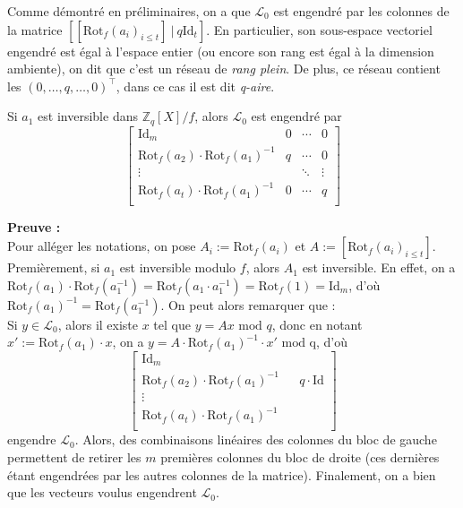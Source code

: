 \documentclass[11pt,a4paper]{article}
\begin{document}
Comme démontré en préliminaires, on a que $\mathcal{L}_0$ est engendré par les colonnes de la matrice $[[\text{Rot}_f(a_i)_{i\leq t}] \ |\ q\text{Id}_t]$. En particulier, son sous-espace vectoriel engendré est égal à l'espace entier (ou encore son rang est égal à la dimension ambiente), on dit que c'est un réseau de \textit{rang plein}. De plus, ce réseau contient les $(0,\dots,q,\dots,0)^\top$, dans ce cas il est dit \textit{q-aire}.\\

\begin{lemma}
Si $a_1$ est inversible dans $\mathbb{Z}_q[X]/f$, alors $\mathcal{L}_0$ est engendré par 
$$ \left[\begin{array}{c|ccc}
\text{Id}_m & 0 &\cdots &0\\
\text{Rot}_f(a_2)\cdot\text{Rot}_f(a_1)^{-1}&q&\cdots & 0\\
\vdots & &\ddots & \vdots\\
\text{Rot}_f(a_t)\cdot\text{Rot}_f(a_1)^{-1}& 0 & \cdots &q\\
\end{array}\right] $$
\end{lemma}
\textbf{Preuve :} \\
Pour alléger les notations, on pose $A_i := \text{Rot}_f(a_i)$ et $A:=[\text{Rot}_f(a_i)_{i\leq t}]$. Premièrement, si $a_1$ est inversible modulo $f$, alors $A_1$ est inversible. En effet, on a $\text{Rot}_f(a_1)\cdot\text{Rot}_f(a_1^{-1})=\text{Rot}_f(a_1\cdot a_1^{-1})=\text{Rot}_f(1)=\text{Id}_m$, d'où $\text{Rot}_f(a_1)^{-1}=\text{Rot}_f(a_1^{-1})$. On peut alors remarquer que : \\

Si $y \in \mathcal{L}_0$, alors il existe $x$ tel que $y=Ax \text{ mod } q$, donc en notant $x':=\text{Rot}_f(a_1)\cdot x$, on a $y=A\cdot\text{Rot}_f(a_1)^{-1}\cdot x' \text{ mod q}$, d'où 
$$ \left[\begin{array}{c|cccc}
\text{Id}_m \\
\text{Rot}_f(a_2)\cdot\text{Rot}_f(a_1)^{-1} & & q\cdot \text{Id}\\
\vdots &\\
\text{Rot}_f(a_t)\cdot\text{Rot}_f(a_1)^{-1}&\\
\end{array}\right] $$
engendre $\mathcal{L}_0$. Alors, des combinaisons linéaires des colonnes du bloc de gauche permettent de retirer les $m$ premières colonnes du bloc de droite (ces dernières étant engendrées par les autres colonnes de la matrice). Finalement, on a bien que les vecteurs voulus engendrent $\mathcal{L}_0$. \\
\end{document}
